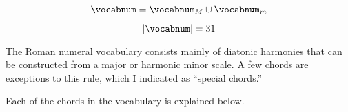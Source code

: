 \begin{equation}
    \vocabnum = \vocabnum_{M} \cup \vocabnum_{m}
\end{equation}

\begin{equation}
    | \vocabnum | = 31
\end{equation}

                

The Roman numeral vocabulary consists mainly of diatonic
harmonies that can be constructed from a major or harmonic
minor scale. A few chords are exceptions to this rule, \:
which I indicated as ``special chords.''

Each of the chords in the vocabulary is explained below.


